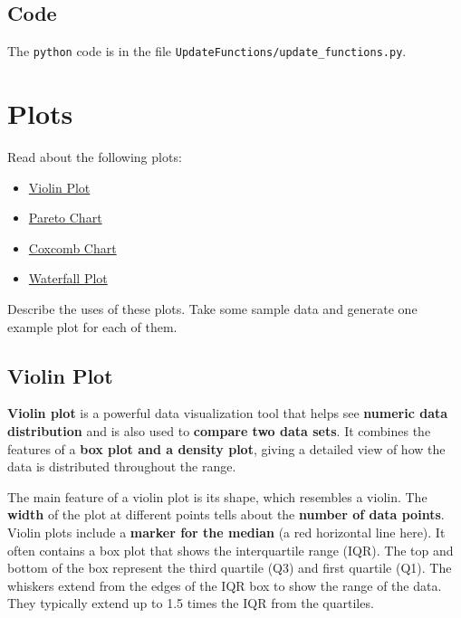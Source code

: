 \documentclass{article}
\begin{document}
\subsection*{Code}
The \texttt{python} code is in the file \texttt{UpdateFunctions/update\_functions.py}.


\setcounter{equation}{0}

\section{Plots}

\begin{tcolorbox}
    Read about the following plots:
    \begin{itemize}
        \item \href{https://www.atlassian.com/data/charts/violin-plot-complete-guide}{Violin Plot}
        \item \href{https://www.jaspersoft.com/articles/what-is-a-pareto-chart#:~:text=The%20Pareto%20Chart%20is%20a,individual%20values%20in%20percentage%20form.}{Pareto Chart}
        \item \href{https://www.flerlagetwins.com/2021/12/coxcomb.html#:~:text=Coxcomb%20charts%20are%20a%20sort,larger%20values%20have%20larger%20angles.}{Coxcomb Chart}
        \item \href{https://en.wikipedia.org/wiki/Waterfall_plot#:~:text=Waterfall%20plots%20are%20often%20used,typically%20spectra%2C%20are%20displayed%20simultaneously.}{Waterfall Plot}
    \end{itemize}
    Describe the uses of these plots. Take some sample data and generate one example
    plot for each of them.
\end{tcolorbox}

\subsection{Violin Plot}

\textbf{Violin plot} is a powerful data visualization tool that helps see \textbf{numeric data distribution} and is also used to \textbf{compare two data sets}. It combines the features of a \textbf{box plot and a density plot}, giving a detailed view of how the data is distributed throughout the range.

The main feature of a violin plot is its shape, which resembles a violin. The \textbf{width} of the plot at different points tells about the \textbf{number of data points}. Violin plots include a \textbf{marker for the median} (a red horizontal line here). It often contains a box plot that shows the interquartile range (IQR). The top and bottom of the box represent the third quartile (Q3) and first quartile (Q1). The whiskers extend from the edges of the IQR box to show the range of the data. They typically extend up to 1.5 times the IQR from the quartiles.
\end{document}
